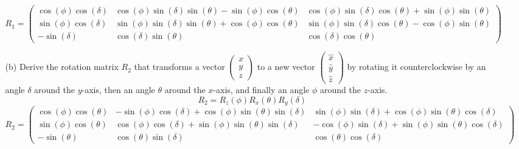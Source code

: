 \documentclass[a3paper,12pt]{extarticle} %
\begin{document}
\begin{enumerate}
\begin{enumerate}
\[        \]
        \[
            R_1 = \begin{pmatrix} \cos(\phi)\cos(\delta) & \cos(\phi)\sin(\delta)\sin(\theta) - \sin(\phi)\cos(\theta) & \cos(\phi)\sin(\delta)\cos(\theta) + \sin(\phi)\sin(\theta) \\ \sin(\phi)\cos(\delta) & \sin(\phi)\sin(\delta)\sin(\theta) + \cos(\phi)\cos(\theta) & \sin(\phi)\sin(\delta)\cos(\theta) - \cos(\phi)\sin(\theta) \\ -\sin(\delta) & \cos(\delta)\sin(\theta) & \cos(\delta)\cos(\theta) \end{pmatrix}
        \]
        \item[(b)] Derive the rotation matrix \(R_2\) that transforms a vector \(\begin{pmatrix} x \\ y \\ z \end{pmatrix}\) to a new vector \(\begin{pmatrix} \hat{x} \\ \hat{y} \\ \hat{z} \end{pmatrix}\) by rotating it counterclockwise by an angle \(\delta\) around the \(y\)-axis, then an angle \(\theta\) around the \(x\)-axis, and finally an angle \(\phi\) around the \(z\)-axis.
        \[
            R_2 = R_z(\phi)R_x(\theta)R_y(\delta)
        \]
        \[
            R_2 = \begin{pmatrix} \cos(\phi)\cos(\theta) & -\sin(\phi)\cos(\delta) + \cos(\phi)\sin(\theta)\sin(\delta) & \sin(\phi)\sin(\delta) + \cos(\phi)\sin(\theta)\cos(\delta) \\ \sin(\phi)\cos(\theta) & \cos(\phi)\cos(\delta) + \sin(\phi)\sin(\theta)\sin(\delta) & -\cos(\phi)\sin(\delta) + \sin(\phi)\sin(\theta)\cos(\delta) \\ -\sin(\theta) & \cos(\theta)\sin(\delta) & \cos(\theta)\cos(\delta) \end{pmatrix}
        \]
        

\end{enumerate}
\end{enumerate}
\end{document}
